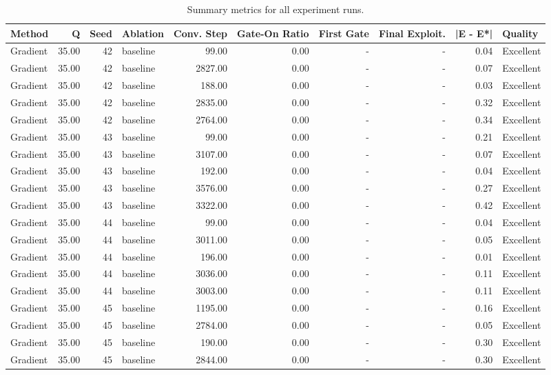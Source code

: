 \begin{table}[htbp]
\centering
\caption{Summary metrics for all experiment runs.}
\label{tab:summary_metrics}
\begin{tabular}{lrrlrrrrrl}
\toprule
Method & Q & Seed & Ablation & Conv. Step & Gate-On Ratio & First Gate & Final Exploit. & |E - E*| & Quality \\
\midrule
Gradient & 35.00 & 42 & baseline & 99.00 & 0.00 & - & - & 0.04 & Excellent \\
Gradient & 35.00 & 42 & baseline & 2827.00 & 0.00 & - & - & 0.07 & Excellent \\
Gradient & 35.00 & 42 & baseline & 188.00 & 0.00 & - & - & 0.03 & Excellent \\
Gradient & 35.00 & 42 & baseline & 2835.00 & 0.00 & - & - & 0.32 & Excellent \\
Gradient & 35.00 & 42 & baseline & 2764.00 & 0.00 & - & - & 0.34 & Excellent \\
Gradient & 35.00 & 43 & baseline & 99.00 & 0.00 & - & - & 0.21 & Excellent \\
Gradient & 35.00 & 43 & baseline & 3107.00 & 0.00 & - & - & 0.07 & Excellent \\
Gradient & 35.00 & 43 & baseline & 192.00 & 0.00 & - & - & 0.04 & Excellent \\
Gradient & 35.00 & 43 & baseline & 3576.00 & 0.00 & - & - & 0.27 & Excellent \\
Gradient & 35.00 & 43 & baseline & 3322.00 & 0.00 & - & - & 0.42 & Excellent \\
Gradient & 35.00 & 44 & baseline & 99.00 & 0.00 & - & - & 0.04 & Excellent \\
Gradient & 35.00 & 44 & baseline & 3011.00 & 0.00 & - & - & 0.05 & Excellent \\
Gradient & 35.00 & 44 & baseline & 196.00 & 0.00 & - & - & 0.01 & Excellent \\
Gradient & 35.00 & 44 & baseline & 3036.00 & 0.00 & - & - & 0.11 & Excellent \\
Gradient & 35.00 & 44 & baseline & 3003.00 & 0.00 & - & - & 0.11 & Excellent \\
Gradient & 35.00 & 45 & baseline & 1195.00 & 0.00 & - & - & 0.16 & Excellent \\
Gradient & 35.00 & 45 & baseline & 2784.00 & 0.00 & - & - & 0.05 & Excellent \\
Gradient & 35.00 & 45 & baseline & 190.00 & 0.00 & - & - & 0.30 & Excellent \\
Gradient & 35.00 & 45 & baseline & 2844.00 & 0.00 & - & - & 0.30 & Excellent \\

\end{tabular}
\end{table}

